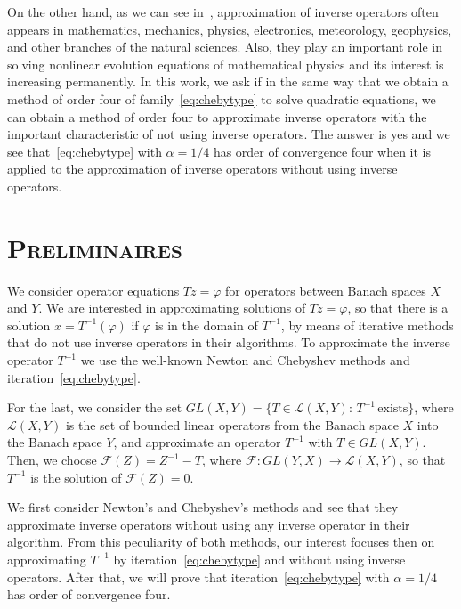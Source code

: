 \documentclass[11pt,twoside,letterpaper]{article} %
\begin{document}
On the other hand, as we can see in~\cite{Yur}, approximation of inverse operators often appears in mathematics, mechanics, physics, electronics, meteorology, geophysics, and other branches of the natural sciences. Also, they play an important role in solving nonlinear evolution equations of mathematical physics and its interest is increasing permanently. In this work, we ask if in the same way that we obtain a method of order four of family~\eqref{eq:chebytype} to solve quadratic equations, we can obtain a method of order four to approximate inverse operators with the important characteristic of not using inverse operators. The answer is yes and we see that~\eqref{eq:chebytype} with $\alpha=1/4$ has order of convergence four when it is applied to the approximation of inverse operators without using inverse operators.


\section{\scshape Preliminaires}

We consider operator equations $Tz=\varphi$ for operators between Banach spaces $X$ and $Y$. We are interested in approximating solutions of $Tz=\varphi$, so that there is a solution $x=T^{-1}(\varphi)$ if $\varphi$ is in the domain of $T^{-1}$, by means of iterative methods that do not use inverse operators in their algorithms. To approximate the inverse operator $T^{-1}$ we use the well-known Newton and Chebyshev methods and iteration~\eqref{eq:chebytype}.

For the last, we consider the set 
$GL(X,Y)=\{T\in\mathcal{L}(X,Y):\, T^{-1}\,\text{exists}\}$, where $\mathcal{L}(X,Y)$ is the set of bounded linear operators from the Banach space $X$ into the Banach space $Y$, and approximate an operator $T^{-1}$ with $T\in GL(X,Y)$.
Then, we choose $\mathcal{F}(Z)=Z^{-1}-T$, where $\mathcal{F}:GL(Y,X)\rightarrow\mathcal{L}(X,Y)$, so that $T^{-1}$ is the solution of $\mathcal{F}(Z)=0$.

We first consider Newton's and Chebyshev's methods and see that they approximate inverse operators without using any inverse operator in their algorithm. From this peculiarity of both methods, our interest focuses then on approximating $T^{-1}$ by iteration~\eqref{eq:chebytype} and without using inverse operators. After that, we will prove that iteration~\eqref{eq:chebytype} with $\alpha=1/4$ has order of convergence four.
\end{document}

